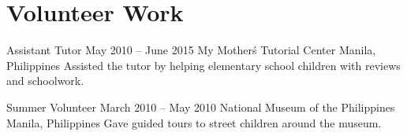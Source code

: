 \section*{Volunteer Work}

\volunteer
	{Assistant Tutor}
	{May 2010 -- June 2015}
	{My Mother\'s Tutorial Center}
	{Manila, Philippines}
	{Assisted the tutor by helping elementary school children with reviews and schoolwork.}
    
\volunteer
	{Summer Volunteer}
	{March 2010 -- May 2010}
	{National Museum of the Philippines}
	{Manila, Philippines}
	{Gave guided tours to street children around the museum.}
